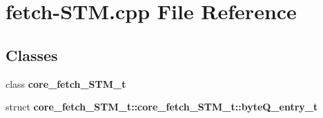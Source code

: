 \section{fetch-STM.cpp File Reference}
\label{fetch-STM_8cpp}
\subsection*{Classes}
\begin{CompactItemize}
\item 
class {\bf core\_\-fetch\_\-STM\_\-t}
\item 
struct {\bf core\_\-fetch\_\-STM\_\-t::core\_\-fetch\_\-STM\_\-t::byteQ\_\-entry\_\-t}
\end{CompactItemize}
